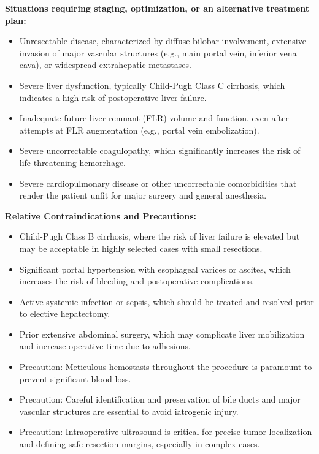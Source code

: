 \textbf{Situations requiring staging, optimization, or an alternative treatment plan:}
\begin{itemize}
  \item Unresectable disease, characterized by diffuse bilobar involvement, extensive invasion of major vascular structures (e.g., main portal vein, inferior vena cava), or widespread extrahepatic metastases.
  \item Severe liver dysfunction, typically Child-Pugh Class C cirrhosis, which indicates a high risk of postoperative liver failure.
  \item Inadequate future liver remnant (FLR) volume and function, even after attempts at FLR augmentation (e.g., portal vein embolization).
  \item Severe uncorrectable coagulopathy, which significantly increases the risk of life-threatening hemorrhage.
  \item Severe cardiopulmonary disease or other uncorrectable comorbidities that render the patient unfit for major surgery and general anesthesia.
\end{itemize}

\textbf{Relative Contraindications and Precautions:}
\begin{itemize}
  \item Child-Pugh Class B cirrhosis, where the risk of liver failure is elevated but may be acceptable in highly selected cases with small resections.
  \item Significant portal hypertension with esophageal varices or ascites, which increases the risk of bleeding and postoperative complications.
  \item Active systemic infection or sepsis, which should be treated and resolved prior to elective hepatectomy.
  \item Prior extensive abdominal surgery, which may complicate liver mobilization and increase operative time due to adhesions.
  \item Precaution: Meticulous hemostasis throughout the procedure is paramount to prevent significant blood loss.
  \item Precaution: Careful identification and preservation of bile ducts and major vascular structures are essential to avoid iatrogenic injury.
  \item Precaution: Intraoperative ultrasound is critical for precise tumor localization and defining safe resection margins, especially in complex cases.
\end{itemize}

